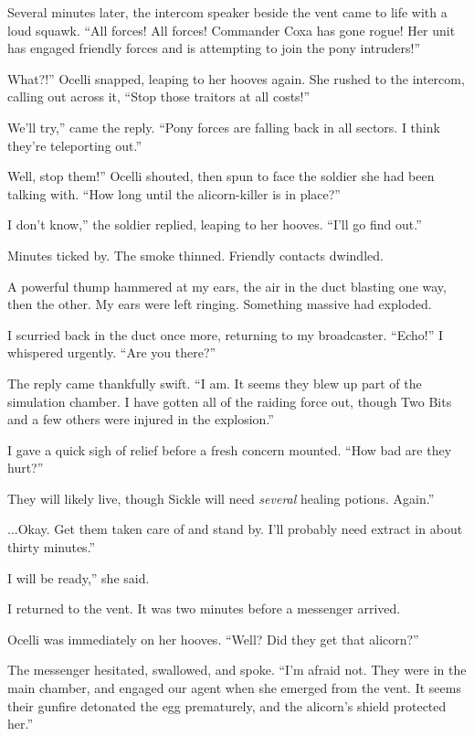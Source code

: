 Several minutes later, the intercom speaker beside the vent came to life with a loud squawk. “All forces! All forces! Commander Coxa has gone rogue! Her unit has engaged friendly forces and is attempting to join the pony intruders!”

\leavevmode{}What?!” Ocelli snapped, leaping to her hooves again. She rushed to the intercom, calling out across it, “Stop those traitors at all costs!”

\leavevmode{}We’ll try,” came the reply. “Pony forces are falling back in all sectors. I think they’re teleporting out.”

\leavevmode{}Well, stop them!” Ocelli shouted, then spun to face the soldier she had been talking with. “How long until the alicorn-killer is in place?”

\leavevmode{}I don’t know,” the soldier replied, leaping to her hooves. “I’ll go find out.”

Minutes ticked by. The smoke thinned. Friendly contacts dwindled.

A powerful thump hammered at my ears, the air in the duct blasting one way, then the other. My ears were left ringing. Something massive had exploded.

I scurried back in the duct once more, returning to my broadcaster. “Echo!” I whispered urgently. “Are you there?”

The reply came thankfully swift. “I am. It seems they blew up part of the simulation chamber. I have gotten all of the raiding force out, though Two Bits and a few others were injured in the explosion.”

I gave a quick sigh of relief before a fresh concern mounted. “How bad are they hurt?”

\leavevmode{}They will likely live, though Sickle will need \textit{several} healing potions. Again.”

\leavevmode{}...Okay. Get them taken care of and stand by. I’ll probably need extract in about thirty minutes.”

\leavevmode{}I will be ready,” she said.

I returned to the vent. It was two minutes before a messenger arrived.

Ocelli was immediately on her hooves. “Well? Did they get that alicorn?”

The messenger hesitated, swallowed, and spoke. “I’m afraid not. They were in the main chamber, and engaged our agent when she emerged from the vent. It seems their gunfire detonated the egg prematurely, and the alicorn’s shield protected her.”

